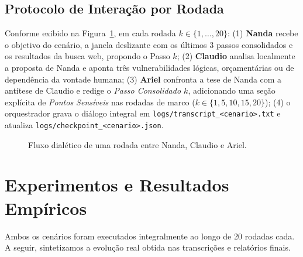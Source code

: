 \documentclass[runningheads]{llncs}
\begin{document}
\subsection{Protocolo de Intera\c{c}\~ao por Rodada}
Conforme exibido na Figura~\ref{fig:loop}, em cada rodada $k \in \{1, \dots, 20\}$: (1) \textbf{Nanda} recebe o objetivo do cen\'ario, a janela deslizante com os \'ultimos 3 passos consolidados e os resultados da busca web, propondo o Passo $k$; (2) \textbf{Claudio} analisa localmente a proposta de Nanda e aponta tr\^es vulnerabilidades l\'ogicas, or\c{c}ament\'arias ou de depend\^encia da vontade humana; (3) \textbf{Ariel} confronta a tese de Nanda com a ant\'itese de Claudio e redige o \emph{Passo Consolidado $k$}, adicionando uma se\c{c}\~ao expl\'icita de \emph{Pontos Sens\'iveis} nas rodadas de marco ($k \in \{1, 5, 10, 15, 20\}$); (4) o orquestrador grava o di\'alogo integral em \texttt{logs/transcript\_<cenario>.txt} e atualiza \texttt{logs/checkpoint\_<cenario>.json}.

\begin{figure}[t]
\centering
{}
\caption{Fluxo dial\'etico de uma rodada entre Nanda, Claudio e Ariel.}\label{fig:loop}
\end{figure}

\section{Experimentos e Resultados Emp\'iricos}

Ambos os cen\'arios foram executados integralmente ao longo de 20 rodadas cada. A seguir, sintetizamos a evolu\c{c}\~ao real obtida nas transcri\c{c}\~oes e relat\'orios finais.
\end{document}
